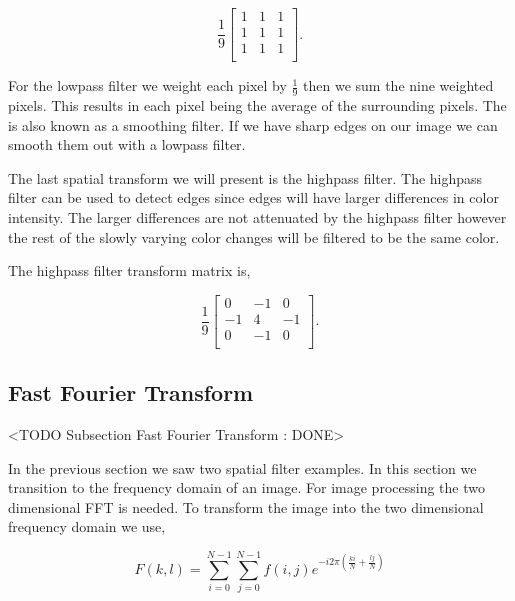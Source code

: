 \begin{equation}
\frac{1}{9}\begin{bmatrix}
1 & 1 & 1\\
1 & 1 & 1\\
1 & 1 & 1\\
\end{bmatrix}.
\end{equation}

For the lowpass filter we weight each pixel by $\frac{1}{9}$ then we sum the nine weighted pixels. This results in each pixel being the average of the surrounding pixels. The  is also known as a smoothing filter. If we have sharp edges on our image we can smooth them out with a lowpass filter. 

The last spatial transform we will present is the highpass filter. The highpass filter can be used to detect edges since edges will have larger differences in color intensity. The larger differences are not attenuated by the highpass filter however the rest of the slowly varying color changes will be filtered to be the same color.

The highpass filter transform matrix is,

\begin{equation}
\frac{1}{9}\begin{bmatrix}
0 & -1 & 0\\
-1 & 4 & -1\\
0 & -1 & 0\\
\end{bmatrix}.
\end{equation}

\cite{gonzalez2002digital}	
	
\subsection{Fast Fourier Transform}
	<TODO Subsection Fast Fourier Transform : DONE>
	
In the previous section we saw two spatial filter examples. In this section we transition to the frequency domain of an image. For image processing the two dimensional \ac{FFT} is needed. To transform the image into the two dimensional frequency domain we use,

\begin{equation}
F\left(k,l\right)=\sum_{i=0}^{N-1}\sum_{j=0}^{N-1}f\left(i,j\right)e^{-i2\pi\left(\frac{ki}{N}+\frac{lj}{N}\right)}
\end{equation}

